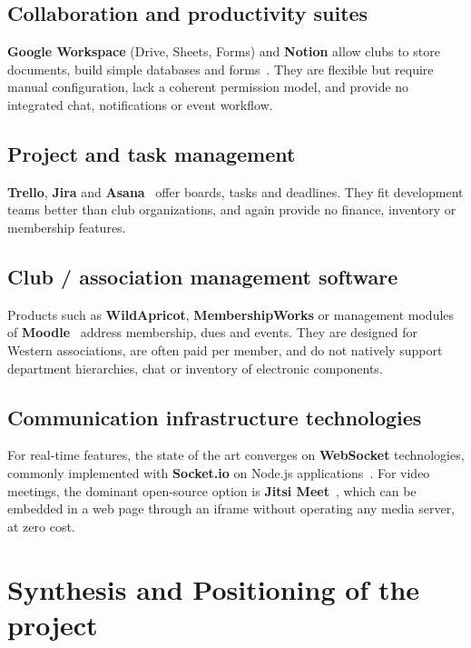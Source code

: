 \documentclass[12pt,a4paper]{report}
\begin{document}
\subsection{Collaboration and productivity suites}
\textbf{Google Workspace} (Drive, Sheets, Forms) and \textbf{Notion} allow clubs to store
documents, build simple databases and forms~\cite{notion}. They are flexible but require
manual configuration, lack a coherent permission model, and provide no integrated chat,
notifications or event workflow.

\subsection{Project and task management}
\textbf{Trello}, \textbf{Jira} and \textbf{Asana}~\cite{trello} offer boards, tasks and
deadlines. They fit development teams better than club organizations, and again provide
no finance, inventory or membership features.

\subsection{Club / association management software}
Products such as \textbf{WildApricot}, \textbf{MembershipWorks} or management modules of
\textbf{Moodle}~\cite{moodle} address membership, dues and events. They are designed for
Western associations, are often paid per member, and do not natively support department
hierarchies, chat or inventory of electronic components.

\subsection{Communication infrastructure technologies}
For real-time features, the state of the art converges on \textbf{WebSocket}
technologies, commonly implemented with \textbf{Socket.io} on Node.js
applications~\cite{socketio}. For video meetings, the dominant open-source option is
\textbf{Jitsi Meet}~\cite{jitsi}, which can be embedded in a web page through an iframe
without operating any media server, at zero cost.

\section{Synthesis and Positioning of the project}
\end{document}

